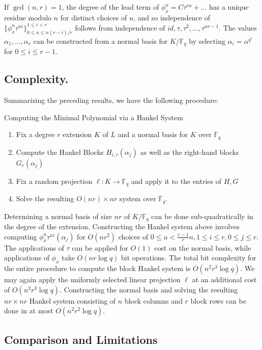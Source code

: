 \documentclass[sigconf]{acmart}
\newcommand{\F}{\mathbb{F}}
\begin{document}
If $\gcd(n,r) = 1$, the degree of the lead term of $\phi_x^u = C\tau^{ru} + \ldots$ has a unique residue modulo $n$ for distinct choices of $u$, and so independence of $\{ \phi_x^{u}\tau^{ni} \}_{0 \leq u \leq n(r-i)/r }^{1 \leq i < r}$ follows from independence of $id, \tau, \tau^2, \ldots, \tau^{nr-1}$. The values $\alpha_1, \ldots, \alpha_r$ can be constructed from a normal basis for $K/\F_q$ by selecting $\alpha_i = \alpha^{q^i}$ for $0 \leq i \leq r - 1$.

\subsection{Complexity.} Summarizing the preceding results, we have the following procedure:

\begin{algorithm}[H]\label{hankel}
\caption{Computing the Minimal Polynomial via a Hankel System }

\begin{enumerate}
    \item Fix a degree $r$ extension $K$ of $L$ and a normal basis for $K$ over $\F_q$
    \item Compute the Hankel Blocks $H_{i,r}(\alpha_j)$ as well as the right-hand blocks $G_r(\alpha_j)$
    \item Fix a random projection $\ell: K \to \F_q$ and apply it to the entries of $H, G$
    \item Solve the resulting $O(nr) \times nr$ system over $\F_q$.
\end{enumerate}
\end{algorithm}
Determining a normal basis of size $nr$ of $K/\F_q$ can be done sub-quadratically in the degree of the extension. Constructing the Hankel system above involves computing $\phi_x^{u}\tau^{ni}(\alpha_j)$ for $O(nr^2)$ choices of $0 \leq u < \frac{r-1}{r}n, 1 \leq i \leq r, 0 \leq j \leq r$. The applications of $\tau$ can be applied for $O(1)$ cost on the normal basis, while applications of $\phi_x$ take $O(nr \log q)$ bit operations. The total bit complexity for the entire procedure to compute the block Hankel system is $O(n^2r^3\log q)$. We may again apply the uniformly selected linear projection $\ell$ at an additional cost of $O(n^2r^3\log q)$. Constructing the normal basis and solving the resulting $nr \times nr$ Hankel system consisting of $n$ block columns and $r$ block rows can be done in at most $O(n^2r^2\log q)$.

\subsection{Comparison and Limitations}
\end{document}
